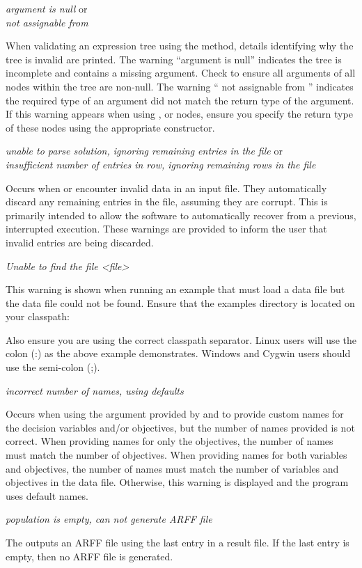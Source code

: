 \noindent
\textit{argument is null} or\\
\textit{ not assignable from }
\begin{indented}
  When validating an expression tree using the  method, details identifying why the tree is invalid are printed.  The warning ``argument is null'' indicates the tree is incomplete and contains a missing argument. Check to ensure all arguments of all nodes within the tree are non-null. The warning `` not assignable from '' indicates the required type of an argument did not match the return type of the argument.  If this warning appears when using ,  or  nodes, ensure you specify the return type of these nodes using the appropriate constructor.
\end{indented}

\noindent
\textit{unable to parse solution, ignoring remaining entries in the file} or\\
\textit{insufficient number of entries in row, ignoring remaining rows in the file}
\begin{indented}
  Occurs when  or  encounter invalid data in an input file.  They automatically discard any remaining entries in the file, assuming they are corrupt.  This is primarily intended to allow the software to automatically recover from a previous, interrupted execution. These warnings are provided to inform the user that invalid entries are being discarded.
\end{indented}

\noindent
\textit{Unable to find the file <file>}
\begin{indented}
  This warning is shown when running an example that must load a data file but the data file could not be found.  Ensure that the examples directory is located on your classpath:
  \begin{indented}
  \end{indented}
  Also ensure you are using the correct classpath separator.  Linux users will use the colon (:) as the above example demonstrates.  Windows and Cygwin users should use the semi-colon (;).
\end{indented}

\noindent
\textit{incorrect number of names, using defaults}
\begin{indented}
  Occurs when using the  argument provided by  and  to provide custom names for the decision variables and/or objectives, but the number of names provided is not correct.  When providing names for only the objectives, the number of names must match the number of objectives.  When providing names for both variables and objectives, the number of names must match the number of variables and objectives in the data file.  Otherwise, this warning is displayed and the program uses default names.
\end{indented}

\noindent
\textit{population is empty, can not generate ARFF file}
\begin{indented}
  The  outputs an ARFF file using the last entry in a result file.  If the last entry is empty, then no ARFF file is generated.
\end{indented}
